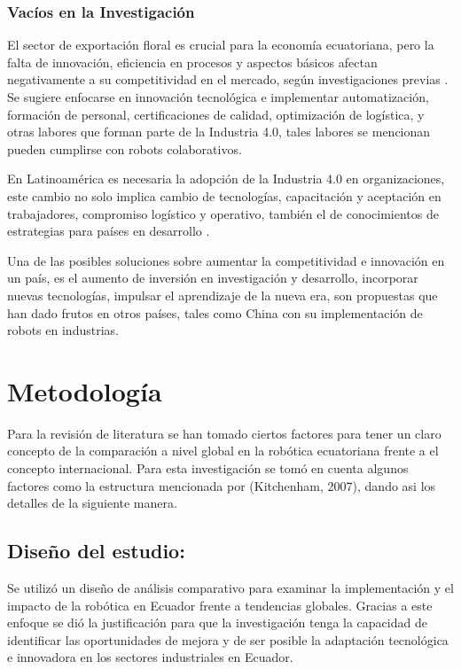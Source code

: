 \documentclass[conference]{IEEEtran}
\begin{document}
\subsubsection{Vacíos en la Investigación}

El sector de exportación floral es crucial para la economía ecuatoriana, pero la falta de innovación, eficiencia en procesos y aspectos básicos afectan negativamente a su competitividad en el mercado, según investigaciones previas \cite{Guaita}. Se sugiere enfocarse en innovación tecnológica e implementar automatización, formación de personal, certificaciones de calidad, optimización de logística, y otras labores que forman parte de la Industria 4.0, tales labores se mencionan pueden cumplirse con robots colaborativos\cite{Goel2020}. 

En Latinoamérica es necesaria la adopción de la Industria 4.0 en organizaciones, este cambio no solo implica cambio de tecnologías, capacitación y aceptación en trabajadores, compromiso logístico y operativo, también el de conocimientos de estrategias para países en desarrollo \cite{Cordero2023}.

Una de las posibles soluciones sobre aumentar la competitividad e innovación en un país, es el aumento de inversión en investigación y desarrollo, incorporar nuevas tecnologías, impulsar el aprendizaje de la nueva era, son propuestas que han dado frutos en otros países, tales como China con su implementación de robots en industrias\cite{Cheng2019}.

\section{Metodología}

Para la revisión de literatura se han tomado ciertos factores para tener un claro concepto de la comparación a nivel global en la robótica ecuatoriana frente a el concepto internacional. Para esta investigación se tomó en cuenta algunos factores como la estructura mencionada por (Kitchenham, 2007), dando asi los detalles de la siguiente manera.

\subsection{Diseño del estudio: }

Se utilizó un diseño de análisis comparativo para examinar la implementación y el impacto de la robótica en Ecuador frente a tendencias globales. Gracias a este enfoque se dió la justificación para que la investigación tenga la capacidad de identificar las oportunidades de mejora y de ser posible la adaptación tecnológica e innovadora en los sectores industriales en Ecuador.
\end{document}
